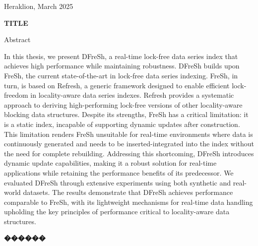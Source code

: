 \documentclass[a4paper,11pt,twoside,openany]{book}
\newcommand{\selg}[0]{\selectlanguage{greek}}
\newcommand{\thesisdate}{March 2025 }
\begin{document}
\begin{titlepage}
\begin{center}
\vfill Heraklion, \thesisdate{}
\end{center}

\thispagestyle{empty}

\end{titlepage}

\cleardoublepage








\thispagestyle{empty}
\begin{titlepage}
\begin{center}
\bc \Large{ \textbf{TITLE}} \ec {}\\\ec
\end{center}

Abstract

In this thesis, we present DFreSh, a real-time lock-free data series index that 
achieves high performance while maintaining robustness. DFreSh builds upon FreSh,
the current state-of-the-art in lock-free data series indexing. FreSh, in turn,
is based on Refresh, a generic framework designed to enable efficient lock-freedom
in locality-aware data series indexes. Refresh provides a systematic approach
to deriving high-performing lock-free versions of other locality-aware blocking
data structures.
Despite its strengths, FreSh has a critical limitation: 
it is a static index, incapable of supporting dynamic updates after construction.
This limitation renders FreSh unsuitable for real-time environments where data
is continuously generated and needs to be inserted-integrated into the index
without the need for complete rebuilding. Addressing this shortcoming,
DFreSh introduces dynamic update capabilities, making it a robust solution
for real-time applications while retaining the performance benefits of its predecessor.
We evaluated DFreSh through extensive experiments using both synthetic
and real-world datasets. The results demonstrate that DFreSh achieves
performance comparable to FreSh, with its lightweight mechanisms for
real-time data handling upholding the key principles of performance critical
to locality-aware data structures. 
\vfill
\end{titlepage}

\cleardoublepage




\thispagestyle{empty}

\selg

\begin{titlepage}
\begin{center}
\bc \Large{ \textbf{������}} \ec {}\\\ec
\end{center}


\vfill

\end{titlepage}
\end{document}
